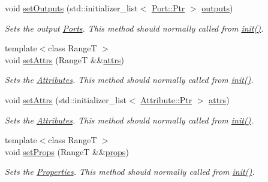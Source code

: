 \begin{DoxyCompactItemize}
void \hyperlink{classdg_1_1deepcore_1_1_node_ab1111101b7b9779695faff5a0ec7e32d}{set\+Outputs} (std\+::initializer\+\_\+list$<$ \hyperlink{classdg_1_1deepcore_1_1_object_a4565c5c2ba828aaaa4354befbac8b2f9}{Port\+::\+Ptr} $>$ \hyperlink{classdg_1_1deepcore_1_1_node_a81cc04114467cd4724c05dfa3d1e975c}{outputs})
\begin{DoxyCompactList}\small\item\em Sets the output \hyperlink{classdg_1_1deepcore_1_1_port}{Ports}. This method should normally called from \hyperlink{classdg_1_1deepcore_1_1_object_a0982aef61087daaf910acfe8b6dcac99}{init()}. \end{DoxyCompactList}\item 
{\footnotesize template$<$class RangeT $>$ }\\void \hyperlink{classdg_1_1deepcore_1_1_node_a9fedbd6a255711fe28efd9c9ac80374c}{set\+Attrs} (RangeT \&\&\hyperlink{classdg_1_1deepcore_1_1_node_acbf1083b3a00898cbd5170ac730e5777}{attrs})
\begin{DoxyCompactList}\small\item\em Sets the \hyperlink{classdg_1_1deepcore_1_1_attribute}{Attributes}. This method should normally called from \hyperlink{classdg_1_1deepcore_1_1_object_a0982aef61087daaf910acfe8b6dcac99}{init()}. \end{DoxyCompactList}\item 
void \hyperlink{classdg_1_1deepcore_1_1_node_a65372be025f81eceaac3e538f4ccfa19}{set\+Attrs} (std\+::initializer\+\_\+list$<$ \hyperlink{classdg_1_1deepcore_1_1_object_a4565c5c2ba828aaaa4354befbac8b2f9}{Attribute\+::\+Ptr} $>$ \hyperlink{classdg_1_1deepcore_1_1_node_acbf1083b3a00898cbd5170ac730e5777}{attrs})
\begin{DoxyCompactList}\small\item\em Sets the \hyperlink{classdg_1_1deepcore_1_1_attribute}{Attributes}. This method should normally called from \hyperlink{classdg_1_1deepcore_1_1_object_a0982aef61087daaf910acfe8b6dcac99}{init()}. \end{DoxyCompactList}\item 
{\footnotesize template$<$class RangeT $>$ }\\void \hyperlink{classdg_1_1deepcore_1_1_node_a51eecd22edf086dd1ab03af684f91c0d}{set\+Props} (RangeT \&\&\hyperlink{classdg_1_1deepcore_1_1_node_a24db8fed9656e8dab99eaa0c1f02e3cb}{props})
\begin{DoxyCompactList}\small\item\em Sets the \hyperlink{classdg_1_1deepcore_1_1_property}{Properties}. This method should normally called from \hyperlink{classdg_1_1deepcore_1_1_object_a0982aef61087daaf910acfe8b6dcac99}{init()}. \end{DoxyCompactList}\item 

\end{DoxyCompactItemize}
